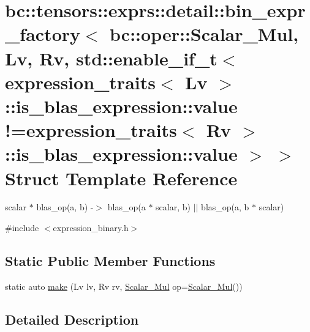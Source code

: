 \hypertarget{structbc_1_1tensors_1_1exprs_1_1detail_1_1bin__expr__factory_3_01bc_1_1oper_1_1Scalar__Mul_00_0179bec0862a78086fe62692cba7b203b3}{}\section{bc\+:\+:tensors\+:\+:exprs\+:\+:detail\+:\+:bin\+\_\+expr\+\_\+factory$<$ bc\+:\+:oper\+:\+:Scalar\+\_\+\+Mul, Lv, Rv, std\+:\+:enable\+\_\+if\+\_\+t$<$ expression\+\_\+traits$<$ Lv $>$\+:\+:is\+\_\+blas\+\_\+expression\+:\+:value !=expression\+\_\+traits$<$ Rv $>$\+:\+:is\+\_\+blas\+\_\+expression\+:\+:value $>$ $>$ Struct Template Reference}
\label{structbc_1_1tensors_1_1exprs_1_1detail_1_1bin__expr__factory_3_01bc_1_1oper_1_1Scalar__Mul_00_0179bec0862a78086fe62692cba7b203b3}


scalar $\ast$ blas\+\_\+op(a, b) -\/$>$ blas\+\_\+op(a $\ast$ scalar, b) $\vert$$\vert$ blas\+\_\+op(a, b $\ast$ scalar)  




{\ttfamily \#include $<$expression\+\_\+binary.\+h$>$}

\subsection*{Static Public Member Functions}
\begin{DoxyCompactItemize}
\item 
static auto \hyperlink{structbc_1_1tensors_1_1exprs_1_1detail_1_1bin__expr__factory_3_01bc_1_1oper_1_1Scalar__Mul_00_0179bec0862a78086fe62692cba7b203b3_abca15f77a3ff6aa85ba17a94e4eb5a28}{make} (Lv lv, Rv rv, \hyperlink{structbc_1_1oper_1_1Scalar__Mul}{Scalar\+\_\+\+Mul} op=\hyperlink{structbc_1_1oper_1_1Scalar__Mul}{Scalar\+\_\+\+Mul}())
\end{DoxyCompactItemize}


\subsection{Detailed Description}
